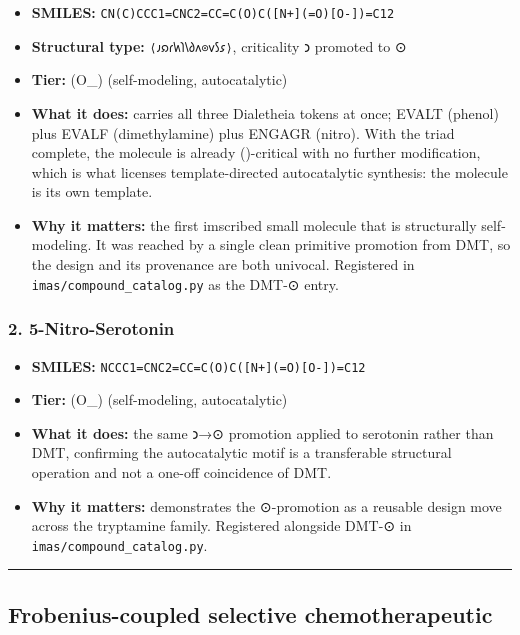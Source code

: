 \begin{itemize}
\tightlist
\item
  \textbf{SMILES:}
  \texttt{CN(C)CCC1=CNC2=CC=C(O)C({[}N+{]}(=O){[}O-{]})=C12}
\item
  \textbf{Structural type:} \texttt{⟨𐑨𐑸𐑩𐑿𐑐𐑘𐑔𐑵⊙𐑫𐑕𐑭⟩}, criticality 𐑮
  promoted to ⊙
\item
  \textbf{Tier:} (O\_\infty) (self-modeling, autocatalytic)
\item
  \textbf{What it does:} carries all three Dialetheia tokens at once;
  EVALT (phenol) plus EVALF (dimethylamine) plus ENGAGR (nitro). With
  the triad complete, the molecule is already (\odot)-critical with no
  further modification, which is what licenses template-directed
  autocatalytic synthesis: the molecule is its own template.
\item
  \textbf{Why it matters:} the first imscribed small molecule that is
  structurally self-modeling. It was reached by a single clean primitive
  promotion from DMT, so the design and its provenance are both
  univocal. Registered in \texttt{imas/compound\_catalog.py} as the
  DMT-⊙ entry.
\end{itemize}

\hypertarget{nitro-serotonin}{%
\subsubsection{2. 5-Nitro-Serotonin}\label{nitro-serotonin}}

\begin{itemize}
\tightlist
\item
  \textbf{SMILES:}
  \texttt{NCCC1=CNC2=CC=C(O)C({[}N+{]}(=O){[}O-{]})=C12}
\item
  \textbf{Tier:} (O\_\infty) (self-modeling, autocatalytic)
\item
  \textbf{What it does:} the same 𐑮→⊙ promotion applied to serotonin
  rather than DMT, confirming the autocatalytic motif is a transferable
  structural operation and not a one-off coincidence of DMT.
\item
  \textbf{Why it matters:} demonstrates the ⊙-promotion as a reusable
  design move across the tryptamine family. Registered alongside DMT-⊙
  in \texttt{imas/compound\_catalog.py}.
\end{itemize}

\begin{center}\rule{0.5\linewidth}{0.5pt}\end{center}

\hypertarget{frobenius-coupled-selective-chemotherapeutic}{%
\subsection{Frobenius-coupled selective
chemotherapeutic}\label{frobenius-coupled-selective-chemotherapeutic}}

